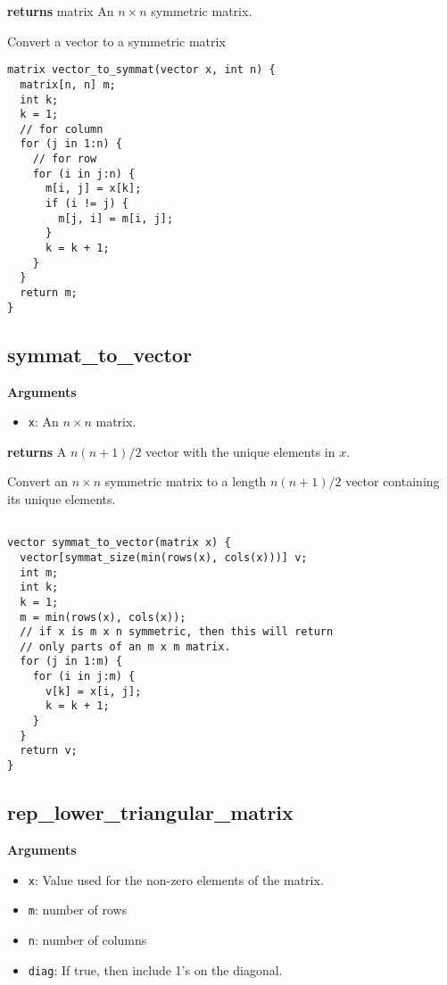 \documentclass[]{book}
\providecommand{\tightlist}{%
  \setlength{\itemsep}{0pt}\setlength{\parskip}{0pt}}
\begin{document}
\textbf{returns} matrix An \(n \times n\) symmetric matrix.

Convert a vector to a symmetric matrix

\begin{verbatim}
matrix vector_to_symmat(vector x, int n) {
  matrix[n, n] m;
  int k;
  k = 1;
  // for column
  for (j in 1:n) {
    // for row
    for (i in j:n) {
      m[i, j] = x[k];
      if (i != j) {
        m[j, i] = m[i, j];
      }
      k = k + 1;
    }
  }
  return m;
}

\end{verbatim}

\subsection{symmat\_to\_vector}\label{symmat_to_vector}

\textbf{Arguments}

\begin{itemize}
\tightlist
\item
  \texttt{x}: An \(n \times n\) matrix.
\end{itemize}

\textbf{returns} A \(n (n + 1) / 2\) vector with the unique elements in
\(x\).

Convert an \(n \times n\) symmetric matrix to a length \(n (n + 1) / 2\)
vector containing its unique elements.

\begin{verbatim}

vector symmat_to_vector(matrix x) {
  vector[symmat_size(min(rows(x), cols(x)))] v;
  int m;
  int k;
  k = 1;
  m = min(rows(x), cols(x));
  // if x is m x n symmetric, then this will return
  // only parts of an m x m matrix.
  for (j in 1:m) {
    for (i in j:m) {
      v[k] = x[i, j];
      k = k + 1;
    }
  }
  return v;
}

\end{verbatim}

\subsection{rep\_lower\_triangular\_matrix}\label{rep_lower_triangular_matrix}

\textbf{Arguments}

\begin{itemize}
\tightlist
\item
  \texttt{x}: Value used for the non-zero elements of the matrix.
\item
  \texttt{m}: number of rows
\item
  \texttt{n}: number of columns
\item
  \texttt{diag}: If true, then include 1's on the diagonal.
\end{itemize}
\end{document}
